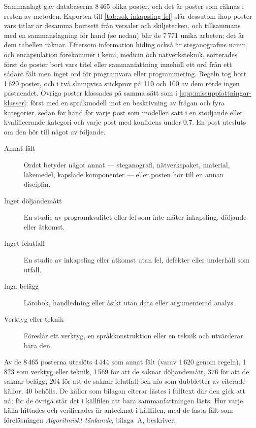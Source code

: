 Sammanlagt gav databaserna 8\,465 olika poster, och det är poster som
räknas i resten av metoden.  Exporten till \cref{tab:sok-inkapsling-fel}
slår dessutom ihop poster vars titlar är desamma bortsett från versaler
och skiljetecken, och tillsammans med en sammanslagning för hand (se
nedan) blir de 7\,771 unika arbeten; det är dem tabellen räknar.
Eftersom
\foreignlanguage{english}{information hiding} också är steganografins
namn, och \foreignlanguage{english}{encapsulation} förekommer i kemi,
medicin och nätverksteknik, sorterades först de poster bort vars titel
eller sammanfattning innehöll ett ord från ett sådant fält men inget ord
för programvara eller programmering.  Regeln tog bort 1\,620 poster, och
i två slumpvisa stickprov på 110 och 100 av dem rörde ingen påståendet.
Övriga poster klassades på samma sätt som i
\cref{app:missuppfattningar-klasser}: först med en språkmodell mot en
beskrivning av frågan och fyra kategorier, sedan för hand för varje post
som modellen satt i en stödjande eller kvalificerande kategori och varje
post med konfidens under 0,7.  En post utesluts om den hör till något av
följande.
\begin{description}
  \item[Annat fält] Ordet betyder något annat --- steganografi,
    nätverkspaket, material, läkemedel, kapslade komponenter --- eller
    posten hör till en annan disciplin.
  \item[Inget döljandemått] En studie av programkvalitet eller fel som
    inte mäter inkapsling, döljande eller åtkomst.
  \item[Inget felutfall] En studie av inkapsling eller åtkomst utan fel,
    defekter eller underhåll som utfall.
  \item[Inga belägg] Lärobok, handledning eller åsikt utan data eller
    argumenterad analys.
  \item[Verktyg eller teknik] Föreslår ett verktyg, en
    språkkonstruktion eller en teknik och utvärderar bara den.
\end{description}
Av de 8\,465 posterna uteslöts 4\,444 som annat fält (varav 1\,620
genom regeln), 1\,823 som verktyg eller teknik, 1\,569 för att de saknar
döljandemått, 376 för att de saknar belägg, 204 för att de saknar
felutfall och nio som dubbletter av citerade källor; 40 behölls.  De
källor som bilagan citerar lästes i fulltext där den gick att nå; för de
övriga står det i källfilen att bara sammanfattningen lästs.  Hur varje
källa hittades och verifierades är antecknat i källfilen, med de fasta
fält som föreläsningen \emph{Algoritmiskt tänkande}, bilaga~A, beskriver.
